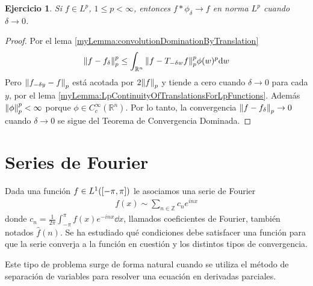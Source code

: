 \documentclass{article}
\newcommand{\integerNumbers}{\mathbb{Z}}
\newcommand{\realNumbers}{\mathbb{R}}
\newtheorem{exercise}{Ejercicio}
\newcommand{\leftOpenInterval}{\left]}
\newcommand{\rightOpenInterval}{\right[}
\newcommand{\leftClosedInterval}{\left[}
\newcommand{\rightClosedInterval}{\right]}
\newcommand{\interval}[3]{%
  \ifstrequal{#1}{oo}{%
    \leftOpenInterval #2, #3 \rightOpenInterval%
  }{%
    \ifstrequal{#1}{co}{%
      \leftClosedInterval #2, #3 \rightOpenInterval%
    }{%
      \ifstrequal{#1}{oc}{
        \leftOpenInterval #2, #3 \rightClosedInterval%
      }{%
        \ifstrequal{#1}{cc}{
          \leftClosedInterval #2, #3 \rightClosedInterval
        }{%
        }%
      }%
    }%
  }%
}
\theoremstyle{remark}
\begin{document}
  \begin{exercise}
    Si \(f \in L^p\), \(1 \leq p < \infty\), entonces \(f * \phi_{\delta} \rightarrow f\) en norma \(L^p\) cuando \(\delta \rightarrow 0\).
  \end{exercise}
  \begin{proof}
    Por el lema \ref{myLemma:convolutionDominationByTranslation}
    \begin{align}
      \norm{f - f_{\delta}}_p^p 
      \leq 
      \int_{\realNumbers^n} \norm{f - T_{- \delta w} f}_p^p \phi(w)^p \dd w
    \end{align}
    Pero \(\norm{f_{- \delta y} - f}_p\) está acotada por \(2 \norm{f}_p\) y tiende a cero cuando \(\delta \rightarrow 0\) para cada \(y\), por el lema \ref{myLemma:LpContinuityOfTranslationsForLpFunctions}.
    Además \(\norm{\phi}_p^p < \infty\) porque \(\phi \in C^{\infty}_c(\realNumbers^n)\).
    Por lo tanto, la convergencia \(\norm{f - f_{\delta}}_p \rightarrow 0\) cuando \(\delta \rightarrow 0\) se sigue del Teorema de Convergencia Dominada.
  \end{proof}

\section{Series de Fourier}

Dada una función \(f \in L^1(\interval{cc}{- \pi}{\pi})\) le asociamos una serie de Fourier
\begin{align}
  f(x)
  \sim
  \sum_{n \in \integerNumbers} c_n e^{i n x}
\end{align}
donde \(c_n = \frac{1}{2 \pi} \int_{- \pi}^{\pi} f(x) e^{- i n x} \dd x\), llamados coeficientes de Fourier, también notados \(\hat{f}(n)\).
Se ha estudiado qué condiciones debe satisfacer una función para que la serie converja a la función en cuestión y los distintos tipos de convergencia.

Este tipo de problema surge de forma natural cuando se utiliza el método de separación de variables para resolver una ecuación en derivadas parciales.
\end{document}

